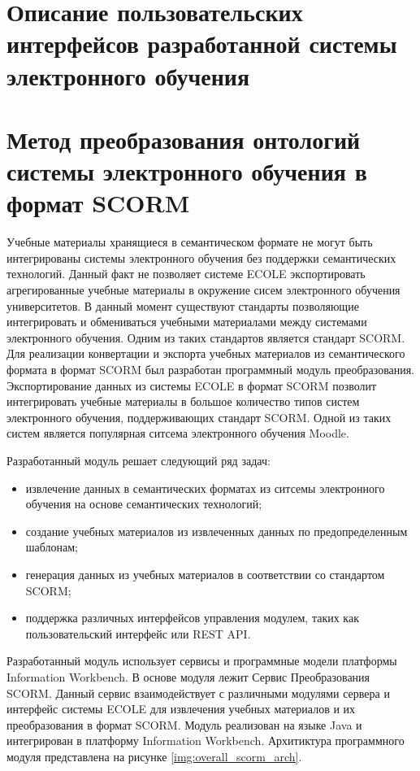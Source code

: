 \section{Описание пользовательских интерфейсов разработанной системы электронного обучения} \label{sect4_2}




\section{Метод преобразования онтологий системы электронного обучения в формат SCORM} \label{sect4_3}

Учебные материалы хранящиеся в семантическом формате не могут быть интегрированы системы электронного обучения без поддержки семантических технологий. Данный факт не позволяет системе ECOLE экспортировать агрегированные учебные материалы в окружение сисем электронного обучения университетов. В данный момент существуют стандарты позволяющие интегрировать и обмениваться учебными материалами между системами электронного обучения. Одним из таких стандартов является стандарт SCORM. Для реализации конвертации и экспорта учебных материалов из семантического формата в формат SCORM был разработан программный модуль преобразования. Экспортирование данных из системы ECOLE в формат SCORM позволит интегрировать учебные материалы в большое количество типов систем электронного обучения, поддерживающих стандарт SCORM. Одной из таких систем является популярная ситсема электронного обучения Moodle.

Разработанный модуль решает следующий ряд задач:

\begin{itemize}
\item извлечение данных в семантических форматах из ситсемы электронного обучения на основе семантических технологий;
\item создание учебных материалов из извлеченных данных по предопределенным шаблонам;
\item генерация данных из учебных материалов в соответствии со стандартом SCORM;
\item поддержка различных интерфейсов управления модулем, таких как  пользовательский интерфейс или REST API.
\end{itemize}

Разработанный модуль использует сервисы и программные модели платформы Information Workbench. В основе модуля лежит Сервис Преобразования SCORM. Данный сервис взаимодействует с различными модулями сервера и интерфейс системы ECOLE для извлечения учебных материалов и их преобразования в формат SCORM. Модуль реализован на языке Java и интегрирован в платформу Information Workbench. Архитиктура программного модуля представлена на рисунке \ref{img:overall_scorm_arch}.

